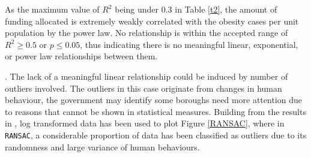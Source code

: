 \documentclass[12pt]{article}
\begin{document}
\begin{table}[H]
\begin{center}
\captionsetup{font=scriptsize}
\caption{coefficients related to the relationship between original and log-transformed obesity density (x) and total budget spent(y)} \label{t2}
\end{center}
\end{table}

As the maximum value of $R^2$ being under $0.3$ in Table \eqref{t2}, the amount of funding allocated is extremely weakly correlated with the obesity cases per unit population by the power law. No relationship is within the accepted range of $R^2 \geq 0.5$ or $p \leq 0.05 $, thus indicating there is no meaningful linear, exponential, or power law relationships between them. 


.
The lack of a meaningful linear relationship could be induced by number of outliers involved. The outliers in this case originate from changes in human behaviour, the government may identify some boroughs need more attention due to reasons that cannot be shown in statistical measures. Building from the results in , log transformed data has been used to plot Figure \eqref{RANSAC}, where in \verb|RANSAC|, a considerable proportion of data has been classified as outliers due to its randomness and large variance of human behaviours. 

\end{document}
